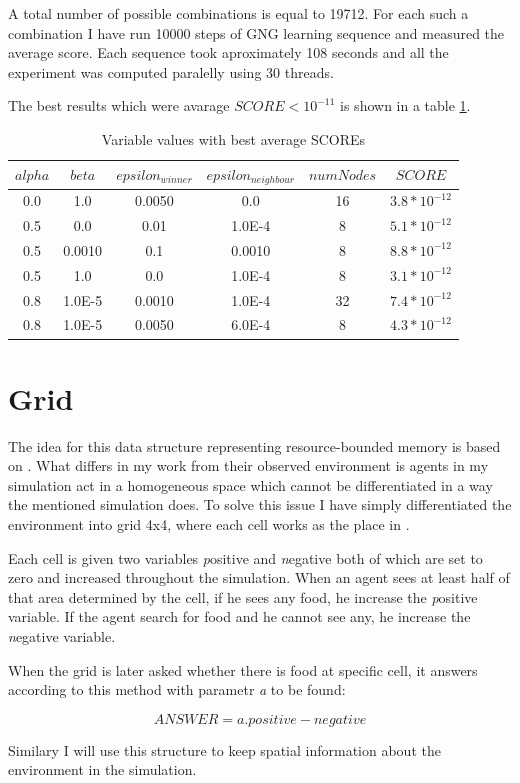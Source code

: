 A total number of possible combinations is equal to 19712. For each such a combination I have run 10000 steps of GNG learning sequence and measured the average score. Each sequence took aproximately 108 seconds and all the experiment was computed paralelly using 30 threads.

The best results which were avarage $SCORE < 10^{-11}$ is shown in a table \ref{usedalgo:gngexperimentresults}.

\begin{table}
\begin{center}
\begin{tabular}{ccccc|c}

$alpha$ & $beta$ & $epsilon_{winner}$ & $epsilon_{neighbour}$ & $numNodes$ & $SCORE$ \\
\hline
0.0 & 1.0 & 0.0050 & 0.0 & 16 & $3.8*10^{-12}$ \\
0.5 & 0.0 & 0.01 & 1.0E-4 & 8 & $5.1*10^{-12}$ \\   
0.5 & 0.0010 & 0.1 & 0.0010 & 8 & $8.8*10^{-12}$ \\ 
0.5 & 1.0 & 0.0 & 1.0E-4 & 8 & $3.1*10^{-12}$ \\     
0.8 & 1.0E-5 & 0.0010 & 1.0E-4 & 32 & $7.4*10^{-12}$ \\
0.8 & 1.0E-5 & 0.0050 & 6.0E-4 & 8 & $4.3*10^{-12}$ \\

\end{tabular}      
\caption{\label{usedalgo:gngexperimentresults}Variable values with best average SCOREs}
\end{center}
\end{table}

\section{Grid}

The idea for this data structure representing resource-bounded memory is based on \cite{Brom:placeandobjects}. What differs in my work from their observed environment is agents in my simulation act in a homogeneous space which cannot be differentiated in a way the mentioned simulation does. To solve this issue I have simply differentiated the environment into grid 4x4, where each cell works as the place in \cite{Brom:placeandobjects}. 

Each cell is given two variables {\emph positive} and {\emph negative} both of which are set to zero and increased throughout the simulation. When an agent sees at least half of that area determined by the cell, if he sees any food, he increase the {\emph positive} variable. If the agent search for food and he cannot see any, he increase the {\emph negative} variable.

When the grid is later asked whether there is food at specific cell, it answers according to this method with parametr {\emph a} to be found:

\begin{equation} ANSWER = a.positive - negative 
\end{equation}
 
Similary I will use this structure to keep spatial information about the environment in the simulation.
